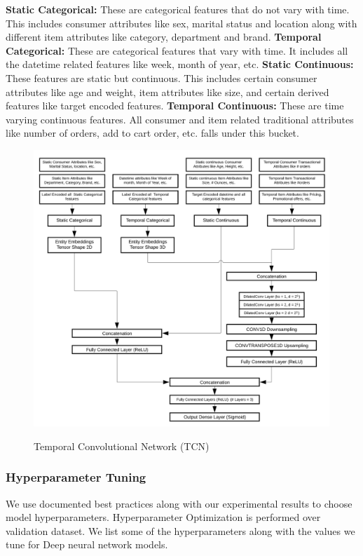 {\bf Static Categorical:} These are categorical features that do not vary with time. This includes consumer
attributes like sex, marital status and location along with different item attributes like category, department and brand.
{\bf Temporal Categorical:} These are categorical features that vary with time. It includes all the datetime 
related features like week, month of year, etc.
{\bf Static Continuous:} These features are static but continuous. This includes certain consumer attributes like
age and weight, item attributes like size, and certain derived features like target encoded features.
{\bf Temporal Continuous:} These are time varying continuous features. All consumer and item related
traditional attributes like number of orders, add to cart order, etc. falls under this bucket.
  \begin{figure}[t]
    \centering 
    \caption{Temporal Convolutional Network (TCN)} 
    \includegraphics[width=4.4in]{img/TCN.png} 
    \label{fig:TCN} 
  \end{figure}
\subsubsection{Hyperparameter Tuning}
We use documented best practices along with our experimental results to
choose model hyperparameters. Hyperparameter Optimization is performed over validation dataset. 
We list some of the hyperparameters along with the values we tune for Deep neural network models.

